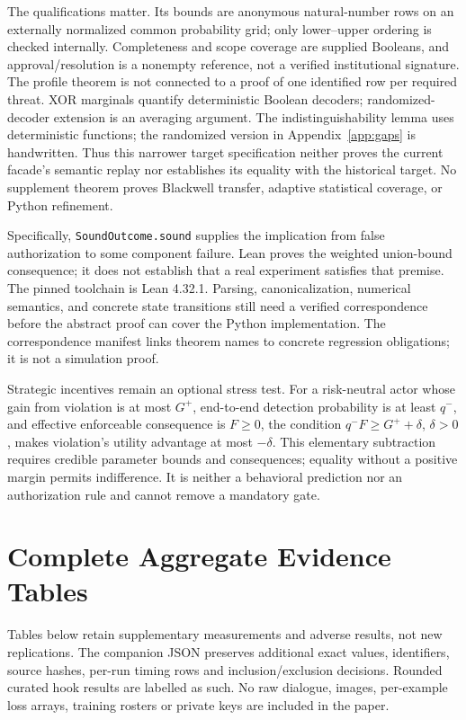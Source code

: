 \documentclass[conference,compsoc]{IEEEtran}
\begin{document}
The qualifications matter. Its bounds are anonymous natural-number rows on an
externally normalized common probability grid; only lower--upper ordering is
checked internally. Completeness and scope coverage are supplied Booleans, and
approval/resolution is a nonempty reference, not a verified institutional
signature. The profile theorem is not connected to a proof of one identified
row per required threat. XOR marginals quantify deterministic Boolean decoders;
randomized-decoder extension is an averaging argument. The indistinguishability
lemma uses deterministic functions; the randomized version in
Appendix~\ref{app:gaps} is handwritten.
Thus this narrower target specification neither proves the current facade's
semantic replay nor establishes its equality with the historical target. No
supplement theorem proves Blackwell transfer, adaptive statistical coverage, or
Python refinement.

Specifically, \texttt{SoundOutcome.sound} supplies the implication from false
authorization to some component failure. Lean proves the weighted union-bound
consequence; it does not establish that a real experiment satisfies that premise.
The pinned toolchain is Lean 4.32.1. Parsing, canonicalization, numerical
semantics, and concrete state transitions still need a verified correspondence
before the abstract proof can cover the Python implementation. The correspondence
manifest links theorem names to concrete regression obligations; it is not a
simulation proof.

Strategic incentives remain an optional stress test. For a risk-neutral actor
whose gain from violation is at most $G^+$, end-to-end detection probability is
at least $q^-$, and effective enforceable consequence is $F\ge0$, the condition
$q^-F\ge G^++\delta$, $\delta>0$, makes violation's utility advantage at most
$-\delta$. This elementary subtraction requires credible parameter bounds and
consequences; equality without a positive margin permits indifference. It is
neither a behavioral prediction nor an authorization rule and cannot remove a
mandatory gate.

\section{Complete Aggregate Evidence Tables}
\label{app:tables}
Tables below retain supplementary measurements and adverse results, not new
replications. The companion JSON preserves additional exact values, identifiers,
source hashes, per-run timing rows and inclusion/exclusion decisions. Rounded
curated hook results are labelled as such. No raw dialogue, images, per-example
loss arrays, training rosters or private keys are included in the paper.
\SupplementaryTables
\end{document}
